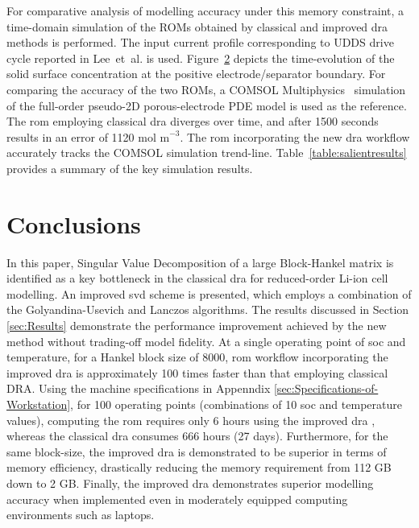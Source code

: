 \begin{figure}
	\caption{}
	\label{fig:truncated}
\end{figure}

For comparative analysis of modelling accuracy under this memory constraint,
a time-domain simulation of the ROMs obtained by classical and improved
\gls{dra} methods is performed. The input current profile corresponding
to UDDS drive cycle reported in Lee~et~al. \cite{LeeChemistruckPlett2012}
is used. Figure~\ref{time_domain_sim} depicts the time-evolution
of the solid surface concentration at the positive electrode/separator
boundary. For comparing the accuracy of the two ROMs, a COMSOL Multiphysics~\cite{Multiphysics2012}
simulation of the full-order pseudo-2D porous-electrode PDE model
is used as the reference. The \gls{rom} employing classical \gls{dra} diverges
over time, and after 1500 seconds results in an error of 1120$\text{ mol m}^{-\text{3}}$$.$
The \gls{rom} incorporating the new \gls{dra} workflow accurately tracks the COMSOL
simulation trend-line. Table~\ref{table:salientresults} provides
a summary of the key simulation results.

\begin{figure}
	\caption{}
	\label{time_domain_sim}
\end{figure}

\section{Conclusions\label{sec:Conclusion}}
In this paper, Singular Value Decomposition of a large Block-Hankel
matrix is identified as a key bottleneck in the classical \gls{dra} for
reduced-order Li-ion cell modelling. An improved \gls{svd} scheme is presented,
which employs a combination of the Golyandina-Usevich and Lanczos
algorithms. The results discussed in Section \ref{sec:Results} demonstrate
the performance improvement achieved by the new method without trading-off
model fidelity. At a single operating point of \gls{soc} and temperature,
for a Hankel block size of 8000, \gls{rom} workflow incorporating the improved
\gls{dra} is approximately 100 times faster than that employing classical
DRA. Using the machine specifications in Appenndix  \ref{sec:Specifications-of-Workstation},
for 100 operating points (combinations of 10 \gls{soc} and temperature values),
computing the \gls{rom} requires only 6 hours using the improved \gls{dra} , whereas
the classical \gls{dra} consumes 666 hours (27 days). Furthermore, for the
same block-size, the improved \gls{dra} is demonstrated to be superior in
terms of memory efficiency, drastically reducing the memory requirement
from 112 GB down to 2 GB. Finally, the improved \gls{dra} demonstrates superior
modelling accuracy when implemented even in moderately equipped computing
environments such as laptops.


